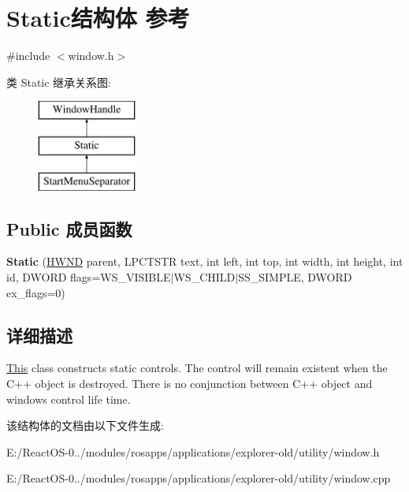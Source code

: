 \hypertarget{struct_static}{}\section{Static结构体 参考}
\label{struct_static}


{\ttfamily \#include $<$window.\+h$>$}

类 Static 继承关系图\+:\begin{figure}[H]
\begin{center}
\leavevmode
\includegraphics[height=3.000000cm]{struct_static}
\end{center}
\end{figure}
\subsection*{Public 成员函数}
\begin{DoxyCompactItemize}
\item 
\mbox{\label{struct_static_a20c3ad25253adafb041834d39203f727}} 
{\bfseries Static} (\hyperlink{interfacevoid}{H\+W\+ND} parent, L\+P\+C\+T\+S\+TR text, int left, int top, int width, int height, int id, D\+W\+O\+RD flags=W\+S\+\_\+\+V\+I\+S\+I\+B\+LE$\vert$W\+S\+\_\+\+C\+H\+I\+LD$\vert$S\+S\+\_\+\+S\+I\+M\+P\+LE, D\+W\+O\+RD ex\+\_\+flags=0)
\end{DoxyCompactItemize}


\subsection{详细描述}
\hyperlink{namespace_this}{This} class constructs static controls. The control will remain existent when the C++ object is destroyed. There is no conjunction between C++ object and windows control life time. 

该结构体的文档由以下文件生成\+:\begin{DoxyCompactItemize}
\item 
E\+:/\+React\+O\+S-\/0../modules/rosapps/applications/explorer-\/old/utility/window.\+h\item 
E\+:/\+React\+O\+S-\/0../modules/rosapps/applications/explorer-\/old/utility/window.\+cpp\end{DoxyCompactItemize}
